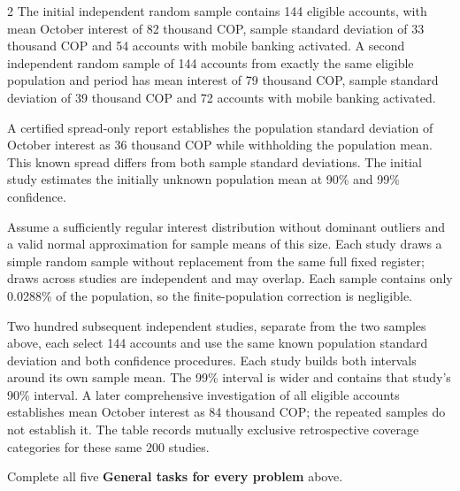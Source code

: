 \begin{multicols}{2}
The initial independent random sample contains 144 eligible accounts, with mean October interest of 82 thousand COP, sample standard deviation of 33 thousand COP and 54 accounts with mobile banking activated. A second independent random sample of 144 accounts from exactly the same eligible population and period has mean interest of 79 thousand COP, sample standard deviation of 39 thousand COP and 72 accounts with mobile banking activated.

A certified spread-only report establishes the population standard deviation of October interest as 36 thousand COP while withholding the population mean. This known spread differs from both sample standard deviations. The initial study estimates the initially unknown population mean at 90\% and 99\% confidence.

Assume a sufficiently regular interest distribution without dominant outliers and a valid normal approximation for sample means of this size. Each study draws a simple random sample without replacement from the same full fixed register; draws across studies are independent and may overlap. Each sample contains only 0.0288\% of the population, so the finite-population correction is negligible.

Two hundred subsequent independent studies, separate from the two samples above, each select 144 accounts and use the same known population standard deviation and both confidence procedures. Each study builds both intervals around its own sample mean. The 99\% interval is wider and contains that study's 90\% interval. A later comprehensive investigation of all eligible accounts establishes mean October interest as 84 thousand COP; the repeated samples do not establish it. The table records mutually exclusive retrospective coverage categories for these same 200 studies.


Complete all five \textbf{General tasks for every problem} above.

\columnbreak



\end{multicols}
